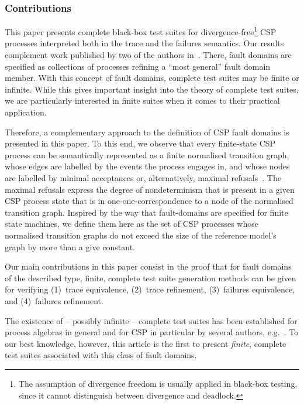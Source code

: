 \subsubsection*{Contributions}

This paper presents complete black-box test suites for divergence-free\footnote{The assumption of divergence freedom is usually applied in black-box testing, since it cannot distinguish between divergence and deadlock.} CSP processes interpreted 
both in the trace   and the failures semantics.  
Our results complement work published by two of the authors
in~\cite{DBLP:conf/pts/CavalcantiS17}. There, fault domains are specified as
collections of processes refining a  ``most general'' fault domain member.
With this concept of fault domains, complete test suites may be finite or
infinite. While this gives important insight into the theory of complete test
suites, we are particularly interested in finite suites when it comes to
their practical application.

Therefore,  a complementary approach to the definition of CSP fault
domains is presented in this paper. To this end, we observe that every finite-state CSP
process can be semantically represented as a finite normalised transition
graph, whose edges are labelled by the events the process engages in, and
whose nodes are labelled by minimal acceptances or, alternatively, maximal
refusals~\cite{Roscoe:1994:CME:197600}. The maximal refusals  express the
degree of nondeterminism that is present in a given CSP process state that is
in one-one-correspondence to a node of the normalised transition graph.
Inspired by the way that fault-domains are specified for finite state
machines, we define them here as the set of CSP processes whose
normalised transition graphs do not exceed the size of the reference model's
graph by more than a give constant.

Our main contributions in this paper consist in the proof that 
for fault domains of the described type, finite, complete
    test suite generation methods can be given for verifying (1)~trace
    equivalence, (2)~trace refinement, (3)~failures equivalence, and
    (4)~failures refinement.
    
The existence of -- possibly infinite -- complete test suites has been established for process algebras in general and  for CSP in particular by several authors, 
e.g.~\cite{Hennessy:1988:ATP:50497,Schneider:1995:OST:203471.203475,DBLP:conf/fm/PeleskaS96,peleska1997a,DBLP:conf/pts/CavalcantiS17}. To our best knowledge, however, this article is the first to present {\it finite}, complete test suites associated with this class of fault domains.

